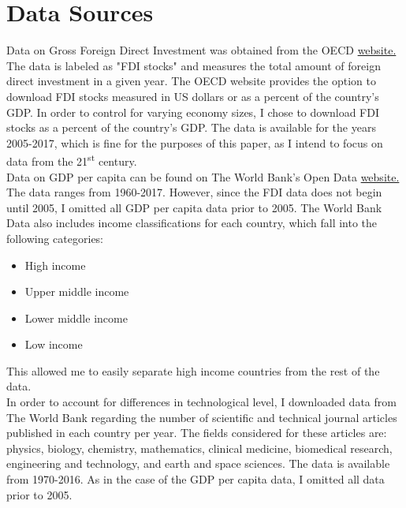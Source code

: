 \documentclass{article}
\begin{document}
\section{Data Sources}
\quad Data on Gross Foreign Direct Investment was obtained from the OECD \href{https://data.oecd.org/}{website.} The data is labeled as "FDI stocks" and measures the total amount of foreign direct investment in a given year. The OECD website provides the option to download FDI stocks measured in US dollars or as a percent of the country's GDP. In order to control for varying economy sizes, I chose to download FDI stocks as a percent of the country's GDP. The data is available for the years 2005-2017, which is fine for the purposes of this paper, as I intend to focus on data from the 21\textsuperscript{st} century.\\
\null\quad Data on GDP per capita can be found on The World Bank's Open Data \href{https://data.worldbank.org/}{website.} The data ranges from 1960-2017. However, since the FDI data does not begin until 2005, I omitted all GDP per capita data prior to 2005. The World Bank Data also includes income classifications for each country, which fall into the following categories:
\begin{itemize}[noitemsep]
    \item High income
    \item Upper middle income
    \item Lower middle income
    \item Low income
\end{itemize}
This allowed me to easily separate high income countries from the rest of the data.\\
\null\quad In order to account for differences in technological level, I downloaded data from The World Bank regarding the number of scientific and technical journal articles published in each country per year. The fields considered for these articles are: physics, biology, chemistry, mathematics, clinical medicine, biomedical research, engineering and technology, and earth and space sciences. The data is available from 1970-2016. As in the case of the GDP per capita data, I omitted all data prior to 2005.
\end{document}
